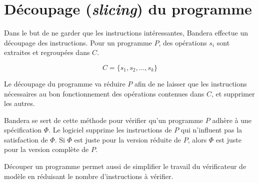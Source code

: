 \section{Découpage (\textit{slicing}) du programme}

Dans le but de ne garder que les instructions intéressantes, Bandera
effectue un découpage des instructions. Pour un programme $P$, des
opérations $s_i$ sont extraites et regroupées dans $C$.

$$C = \{s_1, s_2, \ldots, s_k\}$$

Le découpage du programme va réduire $P$ afin de ne laisser que les
instructions nécessaires au bon fonctionnement des opérations
contenues dans $C$, et supprimer les autres.

Bandera se sert de cette méthode pour vérifier qu'un programme $P$
adhère à une spécification $\Phi$. Le logiciel supprime les
instructions de $P$ qui n'influent pas la satisfaction de $\Phi$. Si
$\Phi$ est juste pour la version réduite de $P$, alors $\Phi$ est
juste pour la version complète de $P$.

Découper un programme permet aussi de simplifier le travail du
vérificateur de modèle en réduisant le nombre d'instructions à
vérifier.
